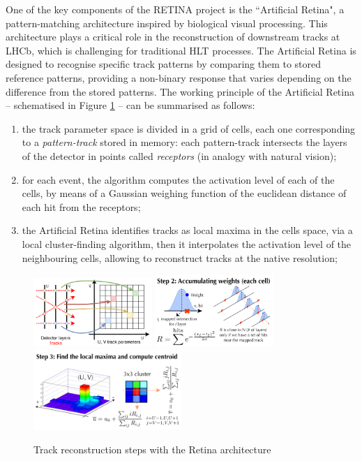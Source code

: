 One of the key components of the RETINA project is the ``Artificial Retina"\cite{Ristori:2000vg}, a pattern-matching architecture inspired by biological visual processing. This architecture plays a critical role in the reconstruction of downstream tracks at LHCb, which is challenging 
for traditional HLT processes. The Artificial Retina is designed to recognise specific track patterns by comparing them to stored reference patterns, providing a non-binary response that varies depending on the difference from the stored patterns. The working principle of the Artificial Retina -- schematised in Figure \ref{fig:retina_algo} -- can be summarised as follows\cite{Ristori:2000vg,Lazzari:2801062, Morello:2888549}:
\begin{enumerate}
\item  the track parameter space is divided in a grid of cells, each one corresponding to a \textit{pattern-track} stored in memory: each pattern-track intersects the layers of the detector in points called \textit{receptors} (in analogy with natural vision);
\item  for each event, the algorithm computes the activation level of each of the cells, by means of a Gaussian weighing function of the euclidean distance of each hit from the receptors;
\item the Artificial Retina identifies tracks as local maxima in the cells space, via a local cluster-finding algorithm, then it interpolates the activation level of the neighbouring cells, allowing to reconstruct tracks at the native resolution;
\end{enumerate}
\begin{figure}
    \centering
    \includegraphics[width=0.4\textwidth]{figures/retina-mapping.png}\hfill
    \includegraphics[width=0.4\textwidth]{figures/retina_algo_step2.png}
    \includegraphics[width=0.5\textwidth]{figures/retina_algo_step3.png}
    \caption{Track reconstruction steps with the Retina architecture}
    \label{fig:retina_algo}
\end{figure}
